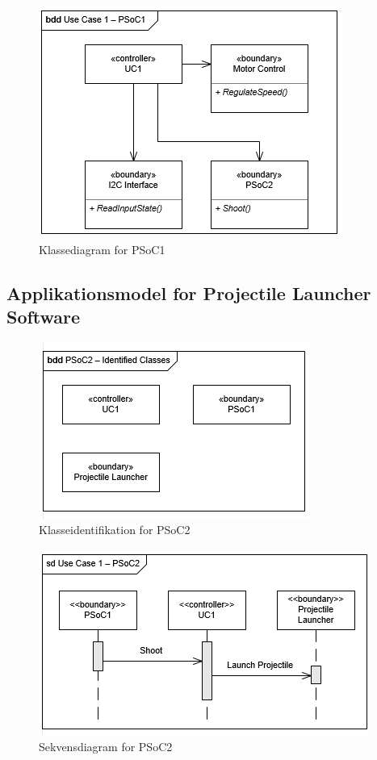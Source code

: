 \begin{figure}[H]
	\centering
	\includegraphics[scale=0.8]{Systemarkitektur/images/klasseUC1PSoC1}
	\caption{Klassediagram for PSoC1}
	\label{fig:klasseUC1PSoC1}
\end{figure}

\subsection{Applikationsmodel for Projectile Launcher Software}

\begin{figure}[H]
	\centering
	\includegraphics[scale=0.8]{Systemarkitektur/images/klasseIdentificationUC1PSoC2}
	\caption{Klasseidentifikation for PSoC2}
	\label{fig:klasseidentifikationUC1PSoC2}
\end{figure}

\begin{figure}[H]
	\centering
	\includegraphics[scale=0.8]{Systemarkitektur/images/UC1PSoC2SequenceDiagram}
	\caption{Sekvensdiagram for PSoC2}
	\label{fig:sekvensUC1PSoC2}
\end{figure}

